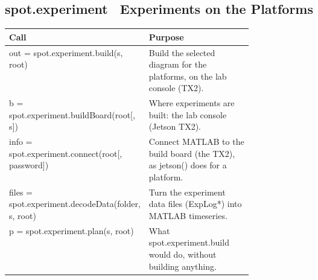 \documentclass[11pt,a4paper]{article}
\begin{document}
\subsection*{spot.experiment \textmd{\textendash\ Experiments on the Platforms}}
\begin{xltabular}{\linewidth}{@{}>{\raggedright\arraybackslash\ttfamily\footnotesize}p{0.47\linewidth} >{\raggedright\arraybackslash\small}X@{}}
\toprule \normalfont\small\textbf{Call} & \textbf{Purpose} \\ \midrule \endhead
out = spot.experiment.build(s, root) & Build the selected diagram for the platforms, on the lab console (TX2). \\
b = spot.experiment.buildBoard(root[, s]) & Where experiments are built: the lab console (Jetson TX2). \\
info = spot.experiment.connect(root[, password]) & Connect MATLAB to the build board (the TX2), as jetson() does for a platform. \\
files = spot.experiment.decodeData(folder, s, root) & Turn the experiment data files (ExpLog*) into MATLAB timeseries. \\
p = spot.experiment.plan(s, root) & What spot.experiment.build would do, without building anything. \\
\bottomrule\end{xltabular}
\end{document}
